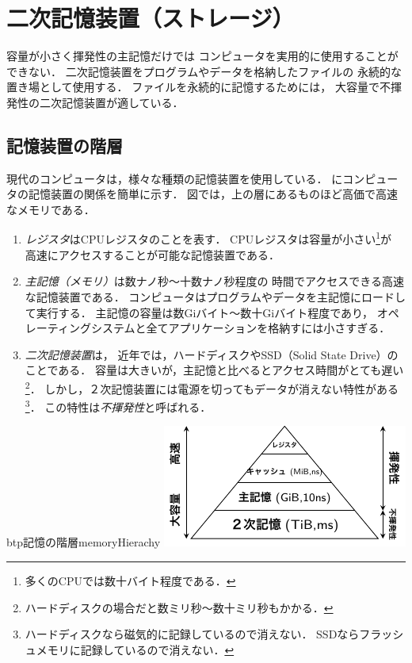 \chapter{二次記憶装置（ストレージ）}
容量が小さく揮発性の主記憶だけでは
コンピュータを実用的に使用することができない．
二次記憶装置をプログラムやデータを格納したファイルの
永続的な置き場として使用する．
ファイルを永続的に記憶するためには，
大容量で不揮発性の二次記憶装置が適している．

\section{記憶装置の階層}
現代のコンピュータは，様々な種類の記憶装置を使用している．
にコンピュータの記憶装置の関係を簡単に示す．
図では，上の層にあるものほど高価で高速なメモリである．

\begin{enumerate}
\item \emph{レジスタ}はCPUレジスタのことを表す．
  CPUレジスタは容量が小さい\footnote{多くのCPUでは数十バイト程度である．}が
  高速にアクセスすることが可能な記憶装置である．
\item \emph{主記憶（メモリ）}は数ナノ秒〜十数ナノ秒程度の
  時間でアクセスできる高速な記憶装置である．
  コンピュータはプログラムやデータを主記憶にロードして実行する．
  主記憶の容量は数Giバイト〜数十Giバイト程度であり，
  オペレーティングシステムと全てアプリケーションを格納すには小さすぎる．
\item \emph{二次記憶装置}は，
  近年では，ハードディスクやSSD（Solid State Drive）のことである．
  容量は大きいが，主記憶と比べるとアクセス時間がとても遅い\footnote{
    ハードディスクの場合だと数ミリ秒〜数十ミリ秒もかかる．}．
  しかし，２次記憶装置には電源を切ってもデータが消えない特性がある\footnote{
    ハードディスクなら磁気的に記録しているので消えない．
    SSDならフラッシュメモリに記録しているので消えない．}．
  この特性は\emph{不揮発性}と呼ばれる．
\end{enumerate}

\begin{myfig}{btp}{記憶の階層}{memoryHierachy}
  \includegraphics[scale=1.6]{Fig/memoryHierarchy.pdf}
\end{myfig}

